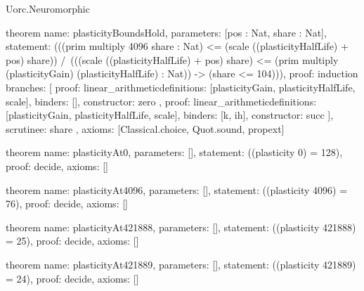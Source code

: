 \begin{lexlean}{Uorc.Neuromorphic}
\begin{semanticmodule}
theorem{
  name: plasticityBoundsHold,
  parameters: [pos : Nat, share : Nat],
  statement: (((prim multiply 4096 share : Nat) <= (scale ((plasticityHalfLife) + pos) share)) /\ (((scale ((plasticityHalfLife) + pos) share) <= (prim multiply (plasticityGain) (plasticityHalfLife) : Nat)) -> (share <= 104))),
  proof: induction{
    branches: [
      {
        proof: linear_arithmetic{definitions: [plasticityGain, plasticityHalfLife, scale]},
        binders: [],
        constructor: zero
      },
      {
        proof: linear_arithmetic{definitions: [plasticityGain, plasticityHalfLife, scale]},
        binders: [k, ih],
        constructor: succ
      }
    ],
    scrutinee: share
  },
  axioms: [Classical.choice, Quot.sound, propext]
}

theorem{
  name: plasticityAt0,
  parameters: [],
  statement: ((plasticity 0) = 128),
  proof: decide{},
  axioms: []
}

theorem{
  name: plasticityAt4096,
  parameters: [],
  statement: ((plasticity 4096) = 76),
  proof: decide{},
  axioms: []
}

theorem{
  name: plasticityAt421888,
  parameters: [],
  statement: ((plasticity 421888) = 25),
  proof: decide{},
  axioms: []
}

theorem{
  name: plasticityAt421889,
  parameters: [],
  statement: ((plasticity 421889) = 24),
  proof: decide{},
  axioms: []
}


\end{semanticmodule}
\end{lexlean}
